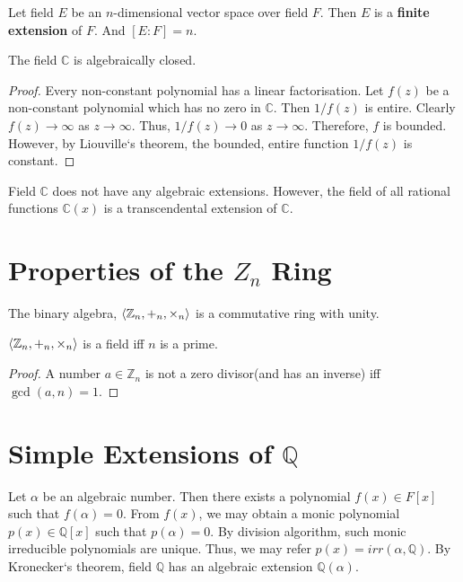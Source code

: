 \begin{definition}
	Let field $E$ be an $n$-dimensional vector space over field $F$.
	Then $E$ is a \textbf{finite extension} of $F$.
	And $[E:F] = n$.
\end{definition}

\begin{theorem}
	The field $\mathbb{C}$ is algebraically closed.
\end{theorem}
\begin{proof}
	Every non-constant polynomial has a linear factorisation.
	Let $f(z)$ be a non-constant polynomial which has no zero in $\mathbb{C}$.
	Then $1/f(z)$ is entire.
	Clearly $f(z) \to \infty$ as $z \to \infty$.
	Thus, $1/f(z) \to 0$ as $z \to \infty$.
	Therefore, $f$ is bounded.
	However, by Liouville`s theorem, the bounded, entire function $1/f(z)$ is constant.
\end{proof}

	Field $\mathbb{C}$ does not have any algebraic extensions. However, the field of all rational functions $\mathbb{C}(x)$ is a transcendental extension of $\mathbb{C}$.

\section{Properties of the $Z_n$ Ring}
	\par The binary algebra, $\left\langle \mathbb{Z}_n,+_n,\times_n \right\rangle$ is a commutative ring with unity. 

	\begin{theorem}
	$\left\langle \mathbb{Z}_n,+_n,\times_n \right\rangle$ is a field iff $n$ is a prime. 
	\end{theorem}
	\begin{proof}
		A number $a \in \mathbb{Z}_n$ is not a zero divisor(and has an inverse) iff $\gcd(a,n) = 1$.
	\end{proof}

\section{Simple Extensions of $\mathbb{Q}$}
	Let $\alpha$ be an algebraic number. Then there exists a polynomial $f(x) \in F[x]$ such that $f(\alpha) = 0$.
	From $f(x)$, we may obtain a monic polynomial $p(x) \in \mathbb{Q}[x]$ such that $p(\alpha) = 0$.
	By division algorithm, such monic irreducible polynomials are unique.
	Thus, we may refer $p(x) = irr(\alpha,\mathbb{Q})$.
	By Kronecker`s theorem, field $\mathbb{Q}$ has an algebraic extension $\mathbb{Q}(\alpha)$.
	
